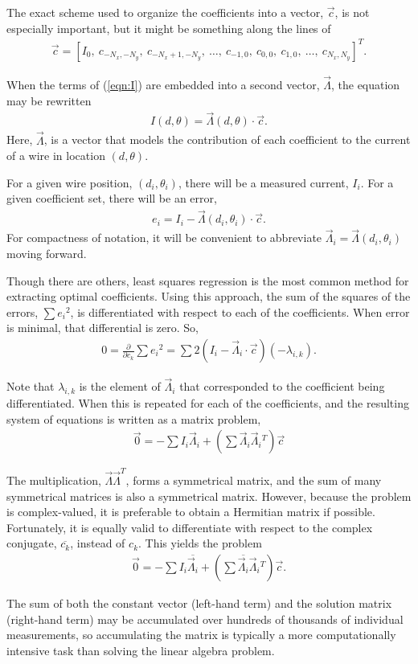 \documentclass{article}
\begin{document}
The exact scheme used to organize the coefficients into a vector, $\vec{c}$, is not especially important, but it might be something along the lines of 
\begin{align}
\vec{c} = [I_0,\ c_{-N_x,-N_y},\ c_{-N_x+1, -N_y},\ \ldots,\ c_{-1,0},\ c_{0,0},\ c_{1,0},\ \ldots,\ c_{N_x,N_y}]^T.
\end{align}

When the terms of (\ref{eqn:I}) are embedded into a second vector, $\vec{\Lambda}$, the equation may be rewritten
\begin{align}
I(d,\theta) = \vec{\Lambda}(d,\theta) \cdot \vec{c}.
\end{align}
Here, $\vec{\Lambda}$, is a vector that models the contribution of each coefficient to the current of a wire in location $(d,\theta)$.

For a given wire position, $(d_i, \theta_i)$, there will be a measured current, $I_i$.  For a given coefficient set, there will be an error,
\begin{align}
e_i = I_i - \vec{\Lambda}(d_i, \theta_i) \cdot \vec{c}.
\end{align}
For compactness of notation, it will be convenient to abbreviate $\vec{\Lambda}_i = \vec{\Lambda}(d_i, \theta_i)$ moving forward.  

Though there are others, least squares regression is the most common method for extracting optimal coefficients.  Using this approach, the sum of the squares of the errors, $\sum e_i{^2}$, is differentiated with respect to each of the coefficients.  When error is minimal, that differential is zero.  So,
\begin{align}
0 = \frac{\partial}{\partial c_k} \sum e_i {^2} = \sum 2\left(I_i - \vec{\Lambda}_i \cdot \vec{c}\right)\left(- \lambda_{i,k}\right).
\end{align}


Note that $\lambda_{i,k}$ is the element of $\vec{\Lambda}_i$ that corresponded to the coefficient being differentiated.  When this is repeated for each of the coefficients, and the resulting system of equations is written as a matrix problem,
\begin{align}
\vec{0} = -\sum I_i \vec{\Lambda}_i + \left(\sum \vec{\Lambda}_i \vec{\Lambda}_i{^T} \right) \vec{c}
\end{align}

The multiplication, $\vec{\Lambda} \vec{\Lambda}^T$, forms a symmetrical matrix, and the sum of many symmetrical matrices is also a symmetrical matrix.  However, because the problem is complex-valued, it is preferable to obtain a Hermitian matrix if possible.  Fortunately, it is equally valid to differentiate with respect to the complex conjugate, $\overline{c_k}$, instead of $c_k$.  This yields the problem
\begin{align}
\vec{0} = -\sum I_i \overline{\vec{\Lambda}_i}  + \left(\sum \overline{\vec{\Lambda}_i} \vec{\Lambda}_i{^T} \right) \vec{c}.
\end{align}

The sum of both the constant vector (left-hand term) and the solution matrix (right-hand term) may be accumulated over hundreds of thousands of individual measurements, so accumulating the matrix is typically a more computationally intensive task than solving the linear algebra problem.
\end{document}
